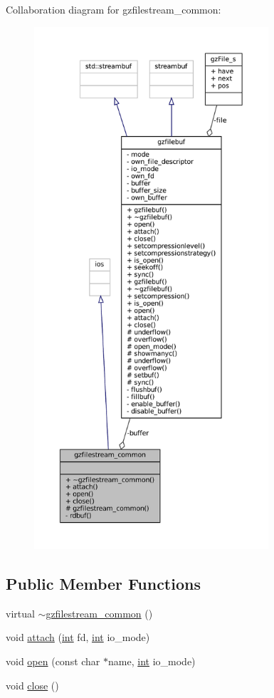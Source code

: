 Collaboration diagram for gzfilestream\+\_\+common\+:
\nopagebreak
\begin{figure}[H]
\begin{center}
\leavevmode
\includegraphics[height=550pt]{classgzfilestream__common__coll__graph}
\end{center}
\end{figure}
\subsection*{Public Member Functions}
\begin{DoxyCompactItemize}
\item 
virtual \mbox{\hyperlink{classgzfilestream__common_acc4fbd5566d5a1f42a443111322a2bb4}{$\sim$gzfilestream\+\_\+common}} ()
\item 
void \mbox{\hyperlink{classgzfilestream__common_a5d89983a0a4842ac15dddc7927031d7e}{attach}} (\mbox{\hyperlink{ioapi_8h_a787fa3cf048117ba7123753c1e74fcd6}{int}} fd, \mbox{\hyperlink{ioapi_8h_a787fa3cf048117ba7123753c1e74fcd6}{int}} io\+\_\+mode)
\item 
void \mbox{\hyperlink{classgzfilestream__common_a642732c6ddbdc437ea996acecf7d419b}{open}} (const char $\ast$name, \mbox{\hyperlink{ioapi_8h_a787fa3cf048117ba7123753c1e74fcd6}{int}} io\+\_\+mode)
\item 
void \mbox{\hyperlink{classgzfilestream__common_a87aa2bfaf8876e1d63edafb7515aaf5f}{close}} ()
\end{DoxyCompactItemize}
